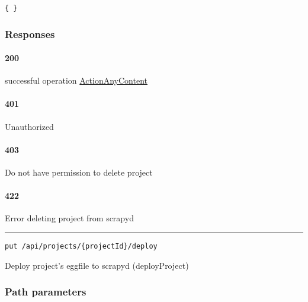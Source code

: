 \begin{verbatim}
{ }
\end{verbatim}

\hypertarget{responses-18}{%
\subsubsection*{Responses}\label{responses-18}}

\hypertarget{section-63}{%
\paragraph{200}\label{section-63}}

successful operation
\protect\hyperlink{ActionAnyContent}{ActionAnyContent}

\hypertarget{section-64}{%
\paragraph{401}\label{section-64}}

Unauthorized \protect\hyperlink{}{}

\hypertarget{section-65}{%
\paragraph{403}\label{section-65}}

Do not have permission to delete project \protect\hyperlink{}{}

\hypertarget{section-66}{%
\paragraph{422}\label{section-66}}

Error deleting project from scrapyd \protect\hyperlink{}{}

\begin{center}\rule{0.5\linewidth}{0.5pt}\end{center}

\protect\hypertarget{deployProject}{}{}



\begin{verbatim}
put /api/projects/{projectId}/deploy
\end{verbatim}

Deploy project's eggfile to scrapyd ({deployProject})

\hypertarget{path-parameters-16}{%
\subsubsection*{Path parameters}\label{path-parameters-16}}

